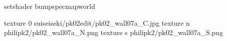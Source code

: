setshader bumpspecmapworld

texture 0 suiseiseki/pk02edit/pk02_wall07a_C.jpg
texture n philipk2/pk02_wall07a_N.png
texture s philipk2/pk02_wall07a_S.png

